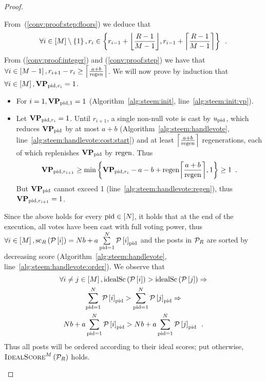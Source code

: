 \begin{proof}
\begin{itemize}
    From~(\ref{conv:proof:step:floors}) we deduce that
    \begin{equation}
      \label{conv:proof:step}
      \forall i \in \left[\postlen\right] \setminus \left\{1\right\}, r_i
      \in \left\{r_{i - 1} + \floor*{\frac{\rounds - 1}{\postlen - 1}}, r_{i -
      1} + \ceil*{\frac{\rounds - 1}{\postlen - 1}}\right\} \enspace.
    \end{equation}
    From (\ref{conv:proof:integer}) and (\ref{conv:proof:step}) we have that
    $\forall i \in \left[\postlen - 1\right], r_{i+1} - r_i \geq
    \ceil*{\frac{a+b}{\regen}}$. We will now prove by induction that $\forall i
    \in \left[\postlen\right], \votpowvec_{\pid, r_i} = 1$.

    \begin{itemize}
      \item For $i = 1, \votpowvec_{\pid, 1} = 1$
      (Algorithm~\ref{alg:steem:init}, line~\ref{alg:steem:init:vp}).
      \item Let $\votpowvec_{\pid, r_i} = 1$. Until $r_{i + 1}$, a single
      non-null vote is cast by $u_\pid$, which reduces $\votpowvec_{\pid}$ by at
      most $a + b$ (Algorithm~\ref{alg:steem:handlevote},
      line~\ref{alg:steem:handlevote:cost:start}) and at least $\ceil*{\frac{a +
      b}{\regen}}$ regenerations, each of which replenishes $\votpowvec_{\pid}$
      by $\regen$. Thus
      \begin{equation*}
        \votpowvec_{\pid, r_{i + 1}} \geq \min{\left\{\votpowvec_{\pid, r_i} - a
        - b + \regen\ceil*{\frac{a + b}{\regen}}, 1\right\}} \geq 1 \enspace.
      \end{equation*}
      But $\votpowvec_{\pid}$ cannot exceed 1
      (line~\ref{alg:steem:handlevote:regen}), thus $\votpowvec_{\pid, r_{i +
      1}} = 1$.
    \end{itemize}
    Since the above holds for every $\pid \in \left[\playerlen\right]$, it holds
    that at the end of the execution, all votes have been cast with full voting
    power, thus $\forall i \in \left[\postlen\right],
    \mathrm{sc}_{\rounds}\left(\postlist\left[i\right]\right) =
    \playerlen b + a \sum\limits_{\pid = 1}^\playerlen
    \postlist\left[i\right]_{\pid}$ and the posts in $\postlist_R$ are sorted by
    decreasing score (Algorithm~\ref{alg:steem:handlevote},
    line~\ref{alg:steem:handlevote:order}). We observe that
    \begin{gather*}
      \forall i \neq j \in \left[\postlen\right], \idsc{\postlist\left[i\right]}
      > \idsc{\postlist\left[j\right]} \Rightarrow \\
      \sum\limits_{\pid = 1}^\playerlen \postlist\left[i\right]_\pid >
      \sum\limits_{\pid = 1}^\playerlen \postlist\left[j\right]_\pid \Rightarrow
      \\
      \playerlen b + a \sum\limits_{\pid = 1}^\playerlen
      \postlist\left[i\right]_\pid > \playerlen b + a \sum\limits_{\pid =
      1}^\playerlen \postlist\left[j\right]_\pid \enspace.
    \end{gather*}
    Thus all posts will be ordered according to their ideal scores; put
    otherwise, $\textsc{IdealScore}^M\left(\postlist_\rounds\right)$ holds.


\end{itemize}
\end{proof}
